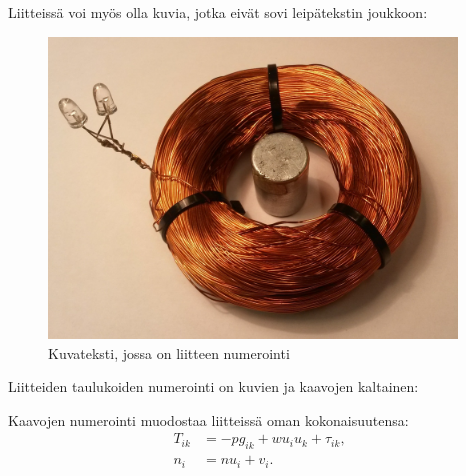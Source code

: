 \documentclass[finnish, 12pt, a4paper, elec, utf8, a-1b, online]{aaltothesis}
\begin{document}
Liitteissä voi myös olla kuvia, jotka
eivät sovi leipätekstin joukkoon:
\begin{figure}[htb]
\centering
\includegraphics[height=8cm]{images/ledspole.jpg}
\caption{Kuvateksti, jossa on liitteen numerointi}
\label{liitekuva}
\end{figure}
Liitteiden taulukoiden numerointi on kuvien ja kaavojen kaltainen:
\begin{table}[htb]
\caption{Taulukon kuvateksti.}
\label{liitetaulukko}
\centering
{}
\end{table}
Kaavojen numerointi muodostaa liitteissä oman kokonaisuutensa:
\begin{align}
T_{ik} &= -p g_{ik} + w u_i u_k + \tau_{ik},  \label{liitekaava3} \\
n_i    &= n u_i + v_i.                      \label{liitekaava4}
\end{align}
\end{document}
